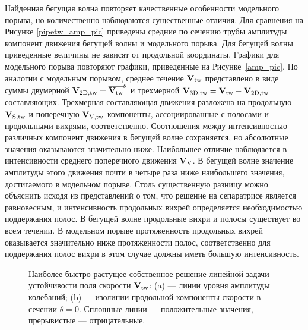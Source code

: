 Найденная бегущая волна повторяет качественные особенности модельного порыва, но количественно наблюдаются существенные отличия. Для сравнения на Рисунке \ref{pipetw_amp_pic} приведены средние по сечению трубы амплитуды компонент движения бегущей волны и модельного порыва. Для бегущей волны приведенные величины не зависят от продольной координаты. Графики для модельного порыва повторяют графики, приведенные на Рисунке~\ref{amp_pic}. По аналогии с модельным порывом, среднее течение $\mathbf{V}_\mathrm{tw}$ представлено в виде суммы двумерной $\mathbf{V}_\mathrm{2D,tw} = \overline{\mathbf{V}_\mathrm{tw}}^\theta$ и трехмерной  $\mathbf{V}_\mathrm{3D,tw} = \mathbf{V}_\mathrm{tw} - \mathbf{V}_\mathrm{2D,tw}$ составляющих. Трехмерная составляющая движения разложена на продольную $\mathbf{V}_\mathrm{S,tw}$ и поперечную $\mathbf{V}_\mathrm{V,tw}$ компоненты, ассоциированные с полосами и продольными вихрями, соответственно. Соотношения между интенсивностью различных компонент движения в бегущей волне сохраняется, но абсолютные значения оказываются значительно ниже. Наибольшее отличие наблюдается в интенсивности среднего поперечного движения $\mathbf{V}_\mathrm{V}$. В бегущей волне значение амплитуды этого движения почти в четыре раза ниже наибольшего значения, достигаемого в модельном порыве. Столь существенную разницу можно объяснить исходя из представлений о том, что решение на сепаратрисе является равновесным, и интенсивность продольных вихрей определяется необходимостью поддержания полос. В бегущей волне продольные вихри и полосы существует во всем течении. В модельном порыве протяженность продольных вихрей оказывается значительно ниже протяженности полос, соответственно для поддержания полос вихри в этом случае должны иметь большую интенсивность. 


\begin{figure}
\caption{Наиболее быстро растущее собственное решение линейной задачи устойчивости поля скорости $\mathbf{V}_\mathrm{tw}$: (a) --- линии уровня амплитуды колебаний; (b) --- изолинии продольной компоненты скорости в сечении $\theta = 0$. Сплошные линии --- положительные значения, прерывистые --- отрицательные.}
\label{pipetw_lin_pic}
\end{figure}


